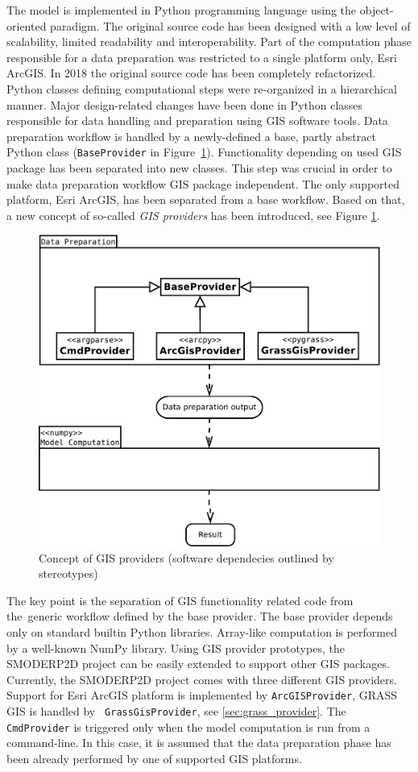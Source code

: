 The model is implemented in Python programming language using the
object-oriented paradigm. The original source code has been designed
with a low level of scalability, limited readability and
interoperability. Part of the computation phase responsible for a data
preparation was restricted to a single platform only, Esri ArcGIS. In
2018 the original source code has been completely refactorized. Python
classes defining computational steps were re-organized in a
hierarchical manner. Major design-related changes have been done in
Python classes responsible for data handling and preparation using GIS
software tools. Data preparation workflow is handled by a
newly-defined a base, partly abstract Python class ({\tt BaseProvider}
in Figure~\ref{fig:uml_diagram}). Functionality depending on used
GIS package has been separated into new classes. This step was crucial
in order to make data preparation workflow GIS package
independent. The only supported platform, Esri ArcGIS, has been
separated from a base workflow. Based on that, a new concept of
so-called {\em GIS providers} has been introduced, see
Figure \ref{fig:uml_diagram}. 

\begin{figure}[ht!]
  \begin{center}
    \includegraphics[width=0.8\columnwidth]{figures/uml_diagram.pdf}
    \caption{Concept of GIS providers (software dependecies outlined by stereotypes)}
    \label{fig:uml_diagram}
  \end{center}
\end{figure}

The key point is the separation of GIS functionality related code from
the~generic workflow defined by the base provider. The base provider
depends only on standard builtin Python libraries. Array-like
computation is performed by a well-known NumPy library. Using GIS
provider prototypes, the SMODERP2D project can be easily extended to
support other GIS packages. Currently, the SMODERP2D project comes
with three different GIS providers. Support for Esri ArcGIS platform
is implemented by {\tt ArcGISProvider}, GRASS GIS is handled by {\tt
  GrassGisProvider}, see \ref{sec:grass_provider}. The {\tt
  CmdProvider} is triggered only when the model computation is run
from a command-line. In this case, it is assumed that the data
preparation phase has been already performed by one of supported GIS
platforms.

